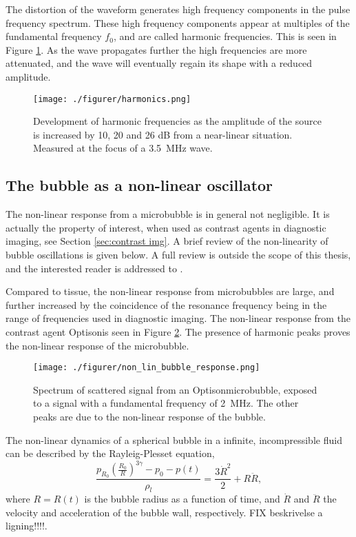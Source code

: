 The distortion of the waveform generates high frequency components in the pulse frequency spectrum. These high frequency components appear at multiples of the fundamental frequency $f_0$, and are called harmonic frequencies. This is seen in Figure \ref{Fig:harmonics}. As the wave propagates further the high frequencies are more attenuated, and the wave will eventually regain its shape with a reduced amplitude. 

\begin{figure}[h]
  \centering
  \label{Fig:harmonics}
  \texttt{[image: ./figurer/harmonics.png]}
  \caption{Development of harmonic frequencies as the amplitude of the source is increased by 10, 20 and 26 dB from a near-linear situation. Measured at the focus of a \SI{3.5}{\mega\hertz} wave\cite{Uck2002}.}
\end{figure} 


\subsection{The bubble as a non-linear oscillator}
The non-linear response from a microbubble is in general not negligible. It is actually the property of interest, when used as contrast agents in diagnostic imaging, see Section \ref{sec:contrast img}. A brief review of the non-linearity of bubble oscillations is given below. A full review is outside the scope of this thesis, and the interested reader is addressed to \cite{Hoff2000}. 

Compared to tissue, the non-linear response from microbubbles are large, and further increased by the coincidence of the resonance frequency being in the range of frequencies used in diagnostic imaging. The non-linear response from the contrast agent   Optison\texttrademark is seen in Figure \ref{Fig:bub_response}. The presence of harmonic peaks proves the non-linear response of the microbubble. 

\begin{figure}[h]
  \centering
  \label{Fig:bub_response}
  \texttt{[image: ./figurer/non\_lin\_bubble\_response.png]}
  \caption{Spectrum of scattered signal from an Optison\texttrademark microbubble, exposed to a signal with a fundamental frequency of \SI{2}{\mega\hertz}. The other peaks are due to the non-linear response of the bubble\cite{Shi1999}.}
\end{figure}
The non-linear dynamics of a spherical bubble in a infinite, incompressible fluid can be described by the Rayleig-Plesset equation,
\begin{equation}
\label{r-p}
\frac{p_{R_0}\left(\frac{R_0}{R}\right)^{3\gamma}-p_0 - p(t)}{\rho_l} = \frac{3\dot{R}^2}{2}+R\ddot{R},
\end{equation}
where $R = R(t)$ is the bubble radius as a function of time, and $\dot{R}$ and $\ddot{R}$ the velocity and acceleration of the bubble wall, respectively. FIX beskrivelse a ligning!!!!.

